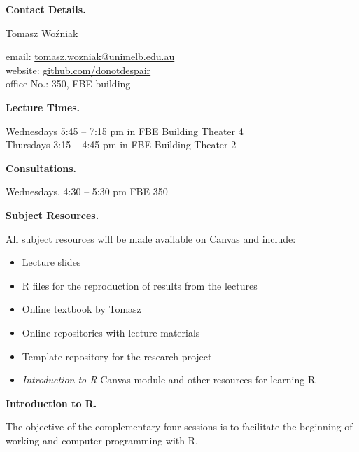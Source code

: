 \documentclass[10pt]{article}
\begin{document}
\bigskip\begin{multicols}{2}

\vspace{0.3cm}\noindent\textbf{Contact Details.} 

\smallskip\indent Tomasz Wo\'zniak 

\smallskip\indent email: \href{mailto:tomasz.wozniak@unimelb.edu.au}{tomasz.wozniak@unimelb.edu.au}\\
\indent website: \href{https://github.com/donotdespair}{github.com/donotdespair}\\
\indent office No.: 350, FBE building



\bigskip\noindent\textbf{Lecture Times.}

\smallskip\noindent Wednesdays 5:45 – 7:15 pm in FBE Building Theater 4\\
Thursdays 3:15 – 4:45 pm in FBE Building Theater 2


%
%


\bigskip\noindent\textbf{Consultations.} 

\smallskip\indent Wednesdays, 4:30 -- 5:30 pm FBE 350


\bigskip\noindent\textbf{Subject Resources.}

\smallskip\noindent All subject resources will be made available on Canvas and include:
\begin{itemize}[itemsep=0pt]
\item Lecture slides
\item R files for the reproduction of results from the lectures
\item Online textbook by Tomasz
\item Online repositories with lecture materials
\item Template repository for the research project
\item \textit{Introduction to R} Canvas module and other resources for learning R
\end{itemize}


\bigskip\noindent\textbf{Introduction to R.} 

\smallskip\noindent The objective of the complementary four sessions is to facilitate the beginning of working and computer programming with R. 


\end{multicols}
\end{document}
